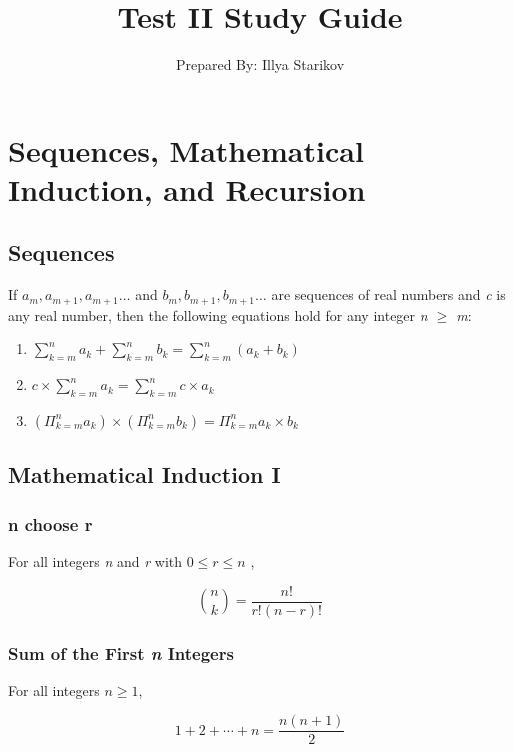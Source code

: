 \documentclass[12pt]{article}
\begin{document}
\title{Test II Study Guide}
\author{Prepared By: Illya Starikov}

\maketitle

\setcounter{section}{4}
\section{Sequences, Mathematical Induction, and Recursion}
\subsection{Sequences}
If $a_m, a_{m+1}, a_{m+1} \ldots$ and $b_m, b_{m+1}, b_{m+1} \ldots$ are sequences of real numbers and \textit{c} is any real number, then the following equations hold for any integer \textit{n $\geq$ m}:

\begin{enumerate}
\item $\sum^{n}_{k = m} a_k + \sum^{n}_{k = m} b_k = \sum^{n}_{k = m} (a_k + b_k)  $
\item $c \times \sum^{n}_{k = m} a_k = \sum^{n}_{k = m} c \times a_k$
\item $( \Pi^{n}_{k = m} a_k ) \times ( \Pi^{n}_{k = m} b_k ) = \Pi^{n}_{k = m} a_k \times b_k $
\end{enumerate}

\subsection{Mathematical Induction I}
\subsubsection*{n choose r}
For all integers \textit{n} and \textit{r} with $0 \leq r \leq n$
,

\begin{equation*}
\binom{n}{k} = \frac{n!}{r!(n - r)!}
\end{equation*}

\subsubsection*{Sum of the First \textit{n} Integers}
For all integers $n \geq 1$,

\begin{equation*}
1 + 2 + \cdots + n = \frac{n (n + 1)}{2}
\end{equation*}
\end{document}
